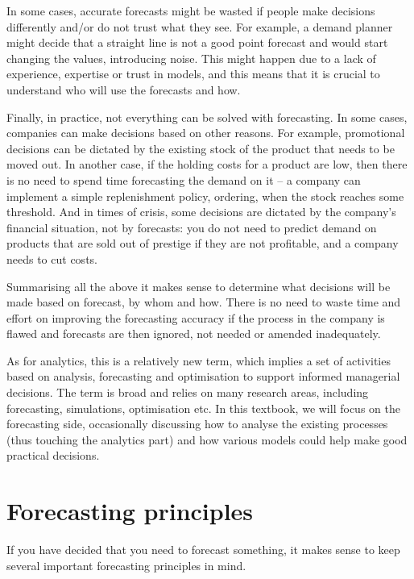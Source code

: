 \documentclass[
]{book}
\theoremstyle{definition}
\theoremstyle{definition}
\theoremstyle{definition}
\theoremstyle{definition}
\theoremstyle{remark}
\begin{document}
In some cases, accurate forecasts might be wasted if people make decisions differently and/or do not trust what they see. For example, a demand planner might decide that a straight line is not a good point forecast and would start changing the values, introducing noise. This might happen due to a lack of experience, expertise or trust in models, and this means that it is crucial to understand who will use the forecasts and how.

Finally, in practice, not everything can be solved with forecasting. In some cases, companies can make decisions based on other reasons. For example, promotional decisions can be dictated by the existing stock of the product that needs to be moved out. In another case, if the holding costs for a product are low, then there is no need to spend time forecasting the demand on it -- a company can implement a simple replenishment policy, ordering, when the stock reaches some threshold. And in times of crisis, some decisions are dictated by the company's financial situation, not by forecasts: you do not need to predict demand on products that are sold out of prestige if they are not profitable, and a company needs to cut costs.

Summarising all the above it makes sense to determine what decisions will be made based on forecast, by whom and how. There is no need to waste time and effort on improving the forecasting accuracy if the process in the company is flawed and forecasts are then ignored, not needed or amended inadequately.

As for analytics, this is a relatively new term, which implies a set of activities based on analysis, forecasting and optimisation to support informed managerial decisions. The term is broad and relies on many research areas, including forecasting, simulations, optimisation etc. In this textbook, we will focus on the forecasting side, occasionally discussing how to analyse the existing processes (thus touching the analytics part) and how various models could help make good practical decisions.

\hypertarget{forecastingPrinciples}{%
\section{Forecasting principles}\label{forecastingPrinciples}}

If you have decided that you need to forecast something, it makes sense to keep several important forecasting principles in mind.
\end{document}
